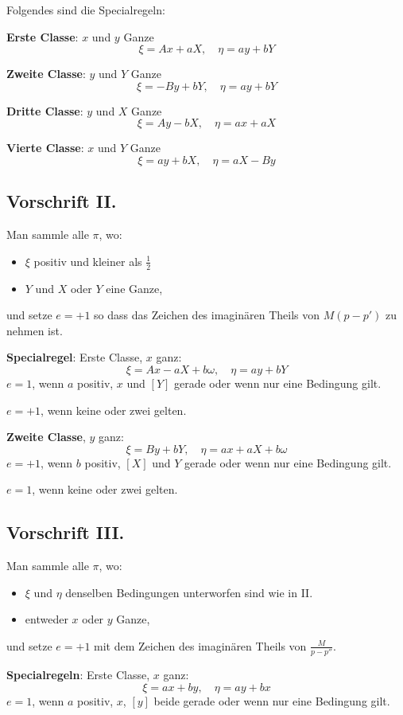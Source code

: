\documentclass[12pt,a4paper]{article}
\begin{document}
Folgendes sind die Specialregeln:

\textbf{Erste Classe}: $x$ und $y$ Ganze
\[
\xi = Ax + aX, \quad \eta = ay + bY
\]

\textbf{Zweite Classe}: $y$ und $Y$ Ganze
\[
\xi = -By + bY, \quad \eta = ay + bY
\]

\textbf{Dritte Classe}: $y$ und $X$ Ganze
\[
\xi = Ay - bX, \quad \eta = ax + aX
\]

\textbf{Vierte Classe}: $x$ und $Y$ Ganze
\[
\xi = ay + bX, \quad \eta = aX - By
\]

\subsection*{Vorschrift II.}

Man sammle alle $\pi$, wo:
\begin{itemize}
\item $\xi$ positiv und kleiner als $\frac{1}{2}$
\item $Y$ und $X$ oder $Y$ eine Ganze,
\end{itemize}
und setze $e = +1$ so dass das Zeichen des imaginären Theils von $M(p-p')$ zu nehmen ist.

\textbf{Specialregel}: Erste Classe, $x$ ganz:
\[
\xi = Ax - aX + b\omega, \quad \eta = ay + bY
\]
$e = 1$, wenn $a$ positiv, $x$ und $[Y]$ gerade oder wenn nur eine Bedingung gilt.

$e = +1$, wenn keine oder zwei gelten.

\textbf{Zweite Classe}, $y$ ganz:
\[
\xi = By + bY, \quad \eta = ax + aX + b\omega
\]
$e = +1$, wenn $b$ positiv, $[X]$ und $Y$ gerade oder wenn nur eine Bedingung gilt.

$e = 1$, wenn keine oder zwei gelten.

\subsection*{Vorschrift III.}

Man sammle alle $\pi$, wo:
\begin{itemize}
\item $\xi$ und $\eta$ denselben Bedingungen unterworfen sind wie in II.
\item entweder $x$ oder $y$ Ganze,
\end{itemize}
und setze $e = +1$ mit dem Zeichen des imaginären Theils von $\frac{M}{p-p''}$.

\textbf{Specialregeln}: Erste Classe, $x$ ganz:
\[
\xi = ax + by, \quad \eta = ay + bx
\]
$e = 1$, wenn $a$ positiv, $x$, $[y]$ beide gerade oder wenn nur eine Bedingung gilt.
\end{document}
